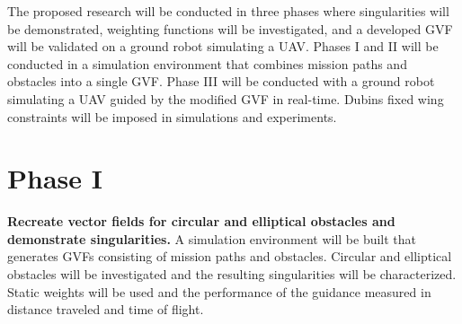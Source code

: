 \documentclass[numbered,pdftex]{ohio-etd}
\begin{document}


The proposed research will be conducted in three phases where singularities will be demonstrated, weighting functions will be investigated, and a developed GVF will be validated on a ground robot simulating a UAV.  Phases I and II will be conducted in a simulation environment that combines mission paths and obstacles into a single GVF. Phase III will be conducted with a ground robot simulating a UAV guided by the modified GVF in real-time. Dubins fixed wing constraints will be imposed in simulations and experiments. 


\section{Phase I}
\textbf{Recreate vector fields for circular and elliptical obstacles and demonstrate singularities.} A simulation environment will be built that generates GVFs consisting of mission paths and obstacles. Circular and elliptical obstacles will be investigated and the resulting singularities will be characterized. Static weights will be used and the performance of the guidance measured in distance traveled and time of flight. 
\end{document}
